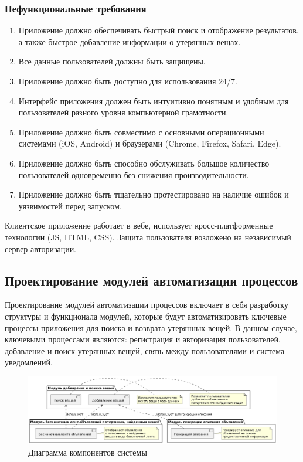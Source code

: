 \subsubsection{Нефункциональные требования}

\begin{enumerate}
	\item Приложение должно обеспечивать быстрый поиск и отображение результатов, а также быстрое добавление информации о утерянных вещах.
	\item Все данные пользователей должны быть защищены.
	\item Приложение должно быть доступно для использования 24/7.
	\item Интерфейс приложения должен быть интуитивно понятным и удобным для пользователей разного уровня компьютерной грамотности.
	\item Приложение должно быть совместимо с основными операционными системами (iOS, Android) и браузерами (Chrome, Firefox, Safari, Edge).
	\item Приложение должно быть способно обслуживать большое количество пользователей одновременно без снижения производительности.
	\item Приложение должно быть тщательно протестировано на наличие ошибок и уязвимостей перед запуском.
\end{enumerate}

Клиентское приложение работает в вебе, использует кросс-платформенные технологии (JS, HTML, CSS). Защита пользователя возложено на независимый сервер авторизации.

\subsection{Проектирование модулей автоматизации процессов}

Проектирование модулей автоматизации процессов включает в себя разработку структуры и функционала модулей, которые будут автоматизировать ключевые процессы приложения для поиска и возврата утерянных вещей. В данном случае, ключевыми процессами являются: регистрация и авторизация пользователей, добавление и поиск утерянных вещей, связь между пользователями и система уведомлений.

\begin{figure}[htb]
	\centering
	\includegraphics[width=.9\textwidth]{images/full-diagram.png}
	\parskip=6pt
	\caption{Диаграмма компонентов системы}
	\label{fig:агддВшфпкфь}
\end{figure}

